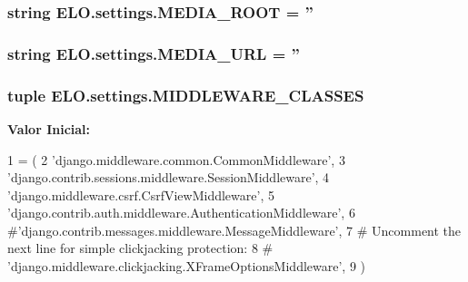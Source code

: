 \hypertarget{namespaceELO_1_1settings_a1f618eef9196cda0088f532a66ec0648}{
\subsubsection[{M\-E\-D\-I\-A\-\_\-\-R\-O\-O\-T}]{\setlength{\rightskip}{0pt plus 5cm}string E\-L\-O.\-settings.\-M\-E\-D\-I\-A\-\_\-\-R\-O\-O\-T = ''}}\label{namespaceELO_1_1settings_a1f618eef9196cda0088f532a66ec0648}
\hypertarget{namespaceELO_1_1settings_acd3e1c3559f7c87f5aad004b76458ddc}{
\subsubsection[{M\-E\-D\-I\-A\-\_\-\-U\-R\-L}]{\setlength{\rightskip}{0pt plus 5cm}string E\-L\-O.\-settings.\-M\-E\-D\-I\-A\-\_\-\-U\-R\-L = ''}}\label{namespaceELO_1_1settings_acd3e1c3559f7c87f5aad004b76458ddc}
\hypertarget{namespaceELO_1_1settings_a968380d6242dca6cc82acb1d806c703d}{
\subsubsection[{M\-I\-D\-D\-L\-E\-W\-A\-R\-E\-\_\-\-C\-L\-A\-S\-S\-E\-S}]{\setlength{\rightskip}{0pt plus 5cm}tuple E\-L\-O.\-settings.\-M\-I\-D\-D\-L\-E\-W\-A\-R\-E\-\_\-\-C\-L\-A\-S\-S\-E\-S}}\label{namespaceELO_1_1settings_a968380d6242dca6cc82acb1d806c703d}
{\bfseries Valor Inicial\-:}
\begin{DoxyCode}
1 = (
2     \textcolor{stringliteral}{'django.middleware.common.CommonMiddleware'},
3     \textcolor{stringliteral}{'django.contrib.sessions.middleware.SessionMiddleware'},
4     \textcolor{stringliteral}{'django.middleware.csrf.CsrfViewMiddleware'},
5     \textcolor{stringliteral}{'django.contrib.auth.middleware.AuthenticationMiddleware'},
6     \textcolor{comment}{#'django.contrib.messages.middleware.MessageMiddleware',}
7     \textcolor{comment}{# Uncomment the next line for simple clickjacking protection:}
8     \textcolor{comment}{# 'django.middleware.clickjacking.XFrameOptionsMiddleware',}
9 )
\end{DoxyCode}
